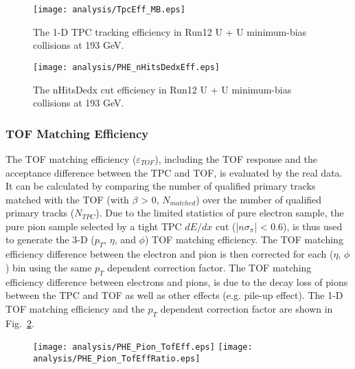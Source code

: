 \begin{figure}[htbp]
\begin{minipage}[htbp]{0.48\linewidth}
\centering
\texttt{[image: analysis/TpcEff\_MB.eps]}
\caption{The 1-D TPC tracking efficiency in Run12 U + U minimum-bias collisions at 193 GeV.\label{1dtpceff}}
\end{minipage}
\hfill
\begin{minipage}[htbp]{0.48\linewidth}
\centering
\texttt{[image: analysis/PHE\_nHitsDedxEff.eps]} 
\caption{The nHitsDedx cut efficiency in Run12 U + U minimum-bias collisions at 193 GeV.\label{nhitsdedxeff}}
\end{minipage}
\end{figure}

\subsubsection{TOF Matching Efficiency}
The TOF matching efficiency ($\varepsilon_{TOF}$), including the TOF response and the acceptance difference between the TPC and TOF, is evaluated by the real data. It can be calculated by comparing the number of qualified primary tracks matched with the TOF (with $\beta$ > 0, $N_{matched}$) over  the number of qualified primary tracks ($N_{TPC}$). Due to the limited statistics of  pure electron sample, the pure pion sample selected by a tight TPC $dE/dx$ cut (|$n\sigma_{\pi}$| < 0.6), is thus used to generate the 3-D ($p_{T}$, $\eta$, and $\phi$) TOF matching efficiency. The TOF matching efficiency difference between the electron and pion is then corrected for each ($\eta$, $\phi$) bin using the same $p_{T}$ dependent correction factor. The TOF matching efficiency difference between electrons and pions, is due to the decay loss of pions between the TPC and TOF as well as other effects (e.g. pile-up effect). The 1-D TOF matching efficiency and the $p_{T}$ dependent correction factor are shown in Fig.~\ref{tofeff}.

\begin{figure}[htbp]
\centering
\texttt{[image: analysis/PHE\_Pion\_TofEff.eps]}
\texttt{[image: analysis/PHE\_Pion\_TofEffRatio.eps]}
\label{tofeff}
\end{figure}

